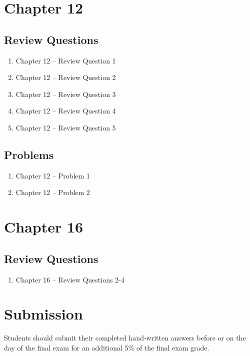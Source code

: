 \documentclass[12pt]{article}
\begin{document}
\section*{Chapter 12}

\subsection*{Review Questions}

\begin{enumerate}
\item Chapter 12 -- Review Question 1
\item Chapter 12 -- Review Question 2
\item Chapter 12 -- Review Question 3
\item Chapter 12 -- Review Question 4
\item Chapter 12 -- Review Question 5
\end{enumerate}

\subsection*{Problems}

\begin{enumerate}
\item Chapter 12 -- Problem 1
\item Chapter 12 -- Problem 2
\end{enumerate}

\vspace{1cm}


\section*{Chapter 16}

\subsection*{Review Questions}

\begin{enumerate}
\item Chapter 16 -- Review Questions 2-4

\end{enumerate}


\section*{Submission}

Students should submit their completed hand-written answers before or on the day of the final exam  for an additional 5\% of the final exam grade.
\end{document}
